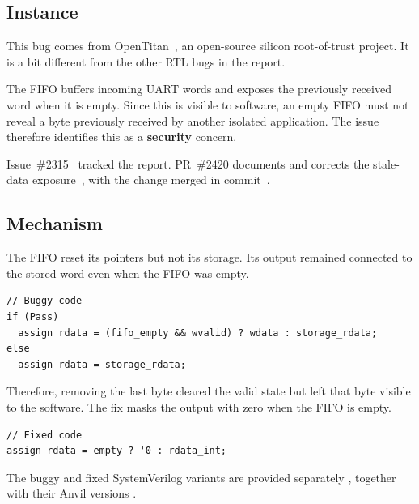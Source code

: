 \documentclass[conference]{IEEEtran}
\begin{document}



\subsection{Instance}

This bug comes from OpenTitan~\cite{opentitan}, an open-source silicon
root-of-trust project. It is a bit different from the other RTL bugs in the
report.

The FIFO buffers incoming UART words and exposes the previously received word
when it is empty. Since this is visible to software, an empty FIFO must not
reveal a byte previously received by another isolated application. The issue
therefore identifies this as a \textbf{security} concern.

Issue~\#2315~\cite{fifo-issue} tracked the report. PR~\#2420
documents and corrects the stale-data exposure~\cite{fifo-fix}, with the
change merged in commit~\cite{fifo-fix-commit}.



\subsection{Mechanism}

The FIFO reset its pointers but not its storage. Its output remained connected
to the stored word even when the FIFO was empty.

\begin{lstlisting}
// Buggy code
if (Pass)
  assign rdata = (fifo_empty && wvalid) ? wdata : storage_rdata;
else
  assign rdata = storage_rdata;
\end{lstlisting}

Therefore, removing the last byte cleared the valid state but left that byte
visible to the software. The fix masks the output with zero when the FIFO is empty.

\begin{lstlisting}
// Fixed code
assign rdata = empty ? '0 : rdata_int;
\end{lstlisting}

The buggy and fixed SystemVerilog variants are provided separately
\cite{bug2-sv-buggy,bug2-sv-fixed}, together with their Anvil versions
\cite{bug2-anvil-buggy,bug2-anvil-fixed}.

\end{document}
